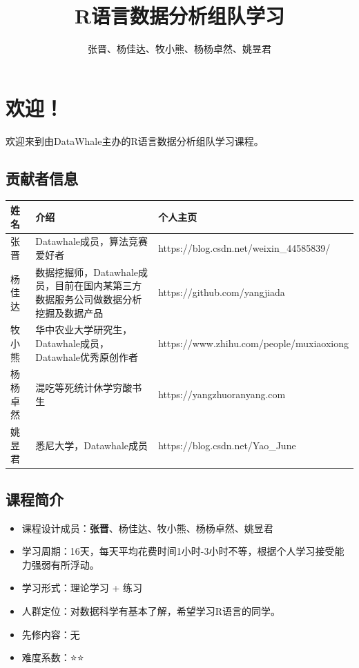 \documentclass[]{ctexbook}
\title{R语言数据分析组队学习}
\author{张晋、杨佳达、牧小熊、杨杨卓然、姚昱君}
\date{}
\providecommand{\tightlist}{%
  \setlength{\itemsep}{0pt}\setlength{\parskip}{0pt}}
\begin{document}
\maketitle

{
\setcounter{tocdepth}{2}
\tableofcontents
}
\hypertarget{welcome}{%
\section*{欢迎！}\label{welcome}}


欢迎来到由DataWhale主办的R语言数据分析组队学习课程。

\hypertarget{ux8d21ux732eux8005ux4fe1ux606f}{%
\subsection*{贡献者信息}\label{ux8d21ux732eux8005ux4fe1ux606f}}


\begin{tabular}{l|l|l}
\hline
姓名 & 介绍 & 个人主页\\
\hline
张晋 & Datawhale成员，算法竞赛爱好者 & https://blog.csdn.net/weixin\_44585839/\\
\hline
杨佳达 & 数据挖掘师，Datawhale成员，目前在国内某第三方数据服务公司做数据分析挖掘及数据产品 & https://github.com/yangjiada\\
\hline
牧小熊 & 华中农业大学研究生，Datawhale成员，Datawhale优秀原创作者 & https://www.zhihu.com/people/muxiaoxiong\\
\hline
杨杨卓然 & 混吃等死统计休学穷酸书生 & https://yangzhuoranyang.com\\
\hline
姚昱君 & 悉尼大学，Datawhale成员 & https://blog.csdn.net/Yao\_June\\
\hline
\end{tabular}

\hypertarget{ux8bfeux7a0bux7b80ux4ecb}{%
\subsection*{课程简介}\label{ux8bfeux7a0bux7b80ux4ecb}}


\begin{itemize}
\tightlist
\item
  课程设计成员：\textbf{张晋}、杨佳达、牧小熊、杨杨卓然、姚昱君
\item
  学习周期：16天，每天平均花费时间1小时-3小时不等，根据个人学习接受能力强弱有所浮动。
\item
  学习形式：理论学习 + 练习
\item
  人群定位：对数据科学有基本了解，希望学习R语言的同学。
\item
  先修内容：无
\item
  难度系数：⭐⭐
\end{itemize}
\end{document}
